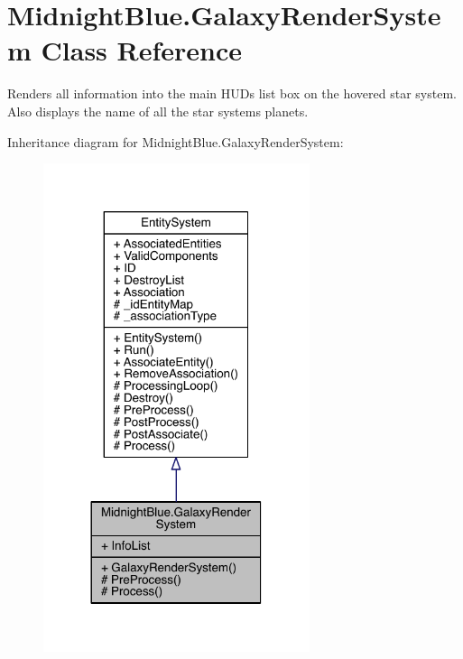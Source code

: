 \hypertarget{class_midnight_blue_1_1_galaxy_render_system}{}\section{Midnight\+Blue.\+Galaxy\+Render\+System Class Reference}
\label{class_midnight_blue_1_1_galaxy_render_system}


Renders all information into the main H\+UD\textquotesingle{}s list box on the hovered star system. Also displays the name of all the star systems planets.  




Inheritance diagram for Midnight\+Blue.\+Galaxy\+Render\+System\+:\nopagebreak
\begin{figure}[H]
\begin{center}
\leavevmode
\includegraphics[width=221pt]{class_midnight_blue_1_1_galaxy_render_system__inherit__graph}
\end{center}
\end{figure}


